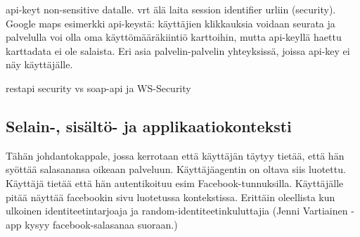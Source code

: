 \documentclass[finnish,gradu]{tktltiki}
\begin{document}
  api-keyt non-sensitive datalle. vrt älä laita session identifier urliin (security). Google maps esimerkki api-keystä: käyttäjien klikkauksia voidaan seurata ja palvelulla voi olla oma käyttömääräkiintiö karttoihin, mutta api-keyllä haettu karttadata ei ole salaista. Eri asia palvelin-palvelin yhteyksissä, joissa api-key ei näy käyttäjälle.

  restapi security vs soap-api ja WS-Security






  \subsection{Selain-, sisältö- ja applikaatiokonteksti} %
  \label{sub:selainkonteksti_vs_applikaatiokonteksti}

  Tähän johdantokappale, jossa kerrotaan että käyttäjän täytyy tietää, että hän syöttää salasanansa oikeaan palveluun. Käyttäjäagentin on oltava siis luotettu. Käyttäjä tietää että hän autentikoituu esim Facebook-tunnuksilla. Käyttäjälle pitää näyttää facebookin sivu luotetussa kontekstissa. Erittäin oleellista kun ulkoinen identiteetintarjoaja ja random-identiteetinkuluttajia (Jenni Vartiainen -app kysyy facebook-salasanaa suoraan.)
\end{document}
